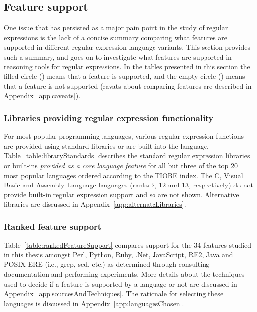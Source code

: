 \subsection{Feature support}
\label{sec:featureSupport}




One issue that has persisted as a major pain point in the study of regular expressions is the lack of a concise summary comparing what features are supported in different regular expression language variants.  This section provides such a summary, and goes on to investigate what features are supported in reasoning tools for regular expressions.  In the tables presented in this section the filled circle (\yes) means that a feature is supported, and the empty circle (\no) means that a feature is not supported (cavats about comparing features are described in Appendix~\ref{app:caveats}).

\subsubsection{Libraries providing regular expression functionality}
For most popular programming languages, various regular expression functions are provided using standard libraries or are built into the language.  Table~\ref{table:libraryStandards} describes the standard regular expression libraries or built-ins \emph{provided as a core language feature} for all but three of the top 20 most popular languages ordered according to the TIOBE index. The C, Visual Basic and Assembly Language languages (ranks 2, 12 and 13, respectively) do not provide built-in regular expression support and so are not shown.  Alternative libraries are discussed in Appendix~\ref{app:alternateLibraries}.





\afterpage{\clearpage}

\subsubsection{Ranked feature support}
\label{sec:rankedFeatureSupport}
Table~\ref{table:rankedFeatureSupport} compares support for the 34 features studied in this thesis amongst Perl, Python, Ruby, .Net, JavaScript, RE2, Java and POSIX ERE (i.e., grep, sed, etc.) as determined through consulting documentation and performing experiments.  More details about the techniques used to decide if a feature is supported by a language or not are discussed in Appendix~\ref{app:sourcesAndTechniques}.  The rationale for selecting these languages is discussed in Appendix~\ref{app:languagesChosen}.

